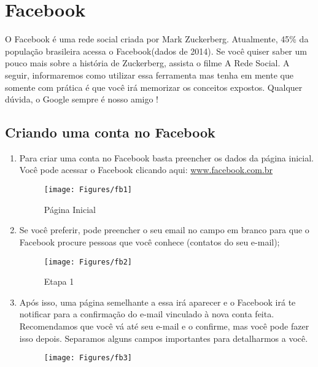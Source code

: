 \documentclass[hidelinks,12pt]{article}
\begin{document}
	\section{Facebook}
	O Facebook é uma rede social criada por Mark Zuckerberg. Atualmente, 45\% da população brasileira acessa o Facebook(dados de 2014). Se você quiser saber um pouco mais sobre a história de Zuckerberg, assista o filme A Rede Social.
	A seguir, informaremos como utilizar essa ferramenta mas tenha em mente que somente com prática é que você irá memorizar os conceitos expostos. Qualquer dúvida, o Google sempre é nosso amigo !

	\subsection{Criando uma conta no Facebook}
		\begin{enumerate}
			\item Para criar uma conta no Facebook basta preencher os dados da página inicial. Você pode acessar o Facebook clicando aqui: \url{www.facebook.com.br}

			\begin{figure}[!h]
				\centering
				\texttt{[image: Figures/fb1]}
				\label{fig:paginafb}
				\caption{Página Inicial}
			\end{figure}

			\item Se você preferir, pode preencher o seu email no campo em branco para que o Facebook procure pessoas que você conhece (contatos do seu e-mail);

			\begin{figure}[!h]
				\centering
				\texttt{[image: Figures/fb2]}
				\label{fig:paginaf2}
				\caption{Etapa 1}
			\end{figure}

			\item Após isso, uma página semelhante a essa irá aparecer e o Facebook irá te notificar para a confirmação do e-mail vinculado à nova conta feita. Recomendamos que você vá até seu e-mail e o confirme, mas você pode fazer isso depois.
			Separamos alguns campos importantes para detalharmos a você.

			\begin{figure}[!h]
				\centering
				\texttt{[image: Figures/fb3]}
				\label{fig:paginaf3}
			\end{figure}

		\end{enumerate}
\end{document}

